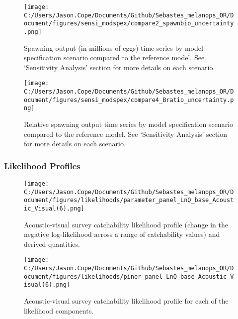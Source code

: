 \documentclass[11pt,
  english,
  letterpaper,
]{article}
\begin{document}
\newpage

\begin{figure}
\centering
\texttt{[image: C:/Users/Jason.Cope/Documents/Github/Sebastes\_melanops\_OR/Document/figures/sensi\_modspex/compare2\_spawnbio\_uncertainty.png]}
\caption{Spawning output (in millions of eggs) time series by model specification scenario compared to the reference model. See `Sensitivity Analysis' section for more details on each scenario.\label{fig:sensi-modspec-ssb}}
\end{figure}

\newpage

\begin{figure}
\centering
\texttt{[image: C:/Users/Jason.Cope/Documents/Github/Sebastes\_melanops\_OR/Document/figures/sensi\_modspex/compare4\_Bratio\_uncertainty.png]}
\caption{Relative spawning output time series by model specification scenario compared to the reference model. See `Sensitivity Analysis' section for more details on each scenario.\label{fig:sensi-modspec-depl}}
\end{figure}

\newpage

\hypertarget{likelihood-profiles-1}{%
\subsubsection{Likelihood Profiles}\label{likelihood-profiles-1}}

\begin{figure}
\centering
\texttt{[image: C:/Users/Jason.Cope/Documents/Github/Sebastes\_melanops\_OR/Document/figures/likelihoods/parameter\_panel\_LnQ\_base\_Acoustic\_Visual(6).png]}
\caption{Acoustic-visual survey catchability likelihood profile (change in the negative log-likelihood across a range of catchability values) and derived quantities.\label{fig:AVq-profile}}
\end{figure}

\newpage

\begin{figure}
\centering
\texttt{[image: C:/Users/Jason.Cope/Documents/Github/Sebastes\_melanops\_OR/Document/figures/likelihoods/piner\_panel\_LnQ\_base\_Acoustic\_Visual(6).png]}
\caption{Acoustic-visual survey catchability likelihood profile for each of the likelihood components.\label{fig:AVq-profile-components}}
\end{figure}
\end{document}
